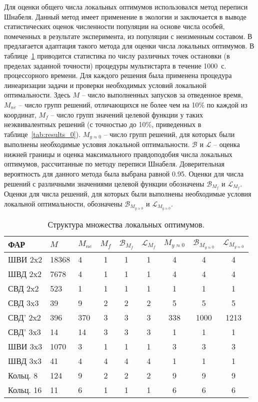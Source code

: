 Для оценки общего числа локальных оптимумов использовался метод переписи Шнабеля. Данный метод имеет применение в экологии и заключается в
выводе статистических оценок численности популяции на основе числа особей, помеченных в результате эксперимента, из популяции с неизменным
составом. В~ предлагается адаптация такого метода для оценки числа локальных оптимумов. В таблице~\ref{tab:structure_0} приводится статистика по числу различных точек остановки (в пределах заданной точности) процедуры мультистарта в течение 1000~с. процессорного времени. Для каждого решения была применена процедура линеаризации задачи и проверки необходимых условий локальной оптимальности. Здесь {$M$} -- число выполненных запусков за отведенное время, $M_{ne}$ -- число групп решений, отличающихся не более чем на 10\% по каждой из координат, {$M_{f}$} -- число групп значений целевой функции у таких неэквивалентных решений (с точностью до 10\%, приведенных в таблице~\ref{tab:results_0}). {$M_{y\approx0}$} -- число групп решений, для которых были выполнены необходимые условия локальной оптимальности. $\mathcal{B}$ и $\mathcal{L}$ -- оценка нижней границы и оценка максимального правдоподобия числа локальных оптимумов, рассчитанные по методу переписи Шнабеля. Доверительная вероятность для данного метода была выбрана равной 0.95. Оценки для числа решений с различными значениями целевой функции обозначены $\mathcal{B}_{M_f}$ и $\mathcal{L}_{M_f}$. Оценки для числа решений, для которых были выполнены необходимые условия локальной оптимальности, обозначены $\mathcal{B}_{M_{y\approx0}}$ и $\mathcal{L}_{M_{y\approx0}}$.


\begin{table}[!h]
\centering
\caption{Структура множества локальных оптимумов.}
\begin{tabular}{|l | l l | c c c | c c c|}
    \hline
    \textbf{ФАР} & \textbf{$M$} & \textbf{$M_{ne}$} & \textbf{$M_{f}$} & \textbf{$\mathcal{B}_{M_f}$} & \textbf{$\mathcal{L}_{M_f}$} & \textbf{$M_{y\approx0}$} & \textbf{$\mathcal{B}_{M_{y\approx0}}$} & \textbf{$\mathcal{L}_{M_{y\approx0}}$}\\
    \hline
    ШВИ 2x2 & 18368 & 4 & 1 & 1 & 1 & 4 & 4 & 4\\
    ШВД 2x2 & 7678  & 4 & 1 & 1 & 1 & 4 & 4 & 4\\
    СВД 2x2  & 523  & 1 & 1 & 1 & 1 & 1 & 1 & 1\\
    СВД 3x3  & 39  & 9 & 2 & 2 & 2 & 5 & 5 & 5\\
    СВД' 2x2  & 396  & 370 & 3 & 3 & 3 & 338 & 1000 & 1213\\
    СВД' 3x3  & 14  & 14 & 3 & 3 & 3 & 1 & 1 & 1\\
    ШВИ 3x3 & 1070  & 3 & 1 & 1 & 1 & 3 & 3 & 3 \\
    ШВД 3x3 & 41  & 4 & 4 & 4 & 4 & 1 & 1 & 1 \\
    Кольц. 8 & 124  & 9 & 2 & 2 & 2 & 9 & 9 & 9\\
    Кольц. 16 & 11  & 6 & 1 & 1 & 1& 6 & 6 & 6\\
    \hline
\end{tabular}
    \label{tab:structure_0}
\end{table}

